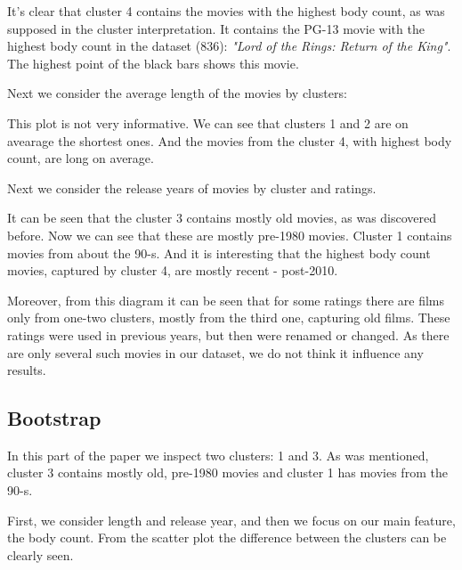 \documentclass[a4paper,14pt]{article}
\begin{document}
It's clear that cluster 4 contains the movies with the highest body count, as was supposed in the cluster interpretation. It contains the PG-13 movie with the highest body count in the dataset (836): \textit{"Lord of the Rings: Return of the King"}. The highest point of the black bars shows this movie. 

Next we consider the average length of the movies by clusters: 
\begin{center}
\end{center}
 
This plot is not very informative. We can see that clusters 1 and 2 are on avearage the shortest ones. And the movies from the cluster 4, with highest body count, are long on average. 

Next we consider the release years of movies by cluster and ratings.

\begin{center}
\end{center}
 
It can be seen that the cluster 3 contains mostly old movies, as was discovered before. Now we can see that these are mostly pre-1980 movies. Cluster 1 contains movies from about the 90-s.
And it is interesting that the highest body count movies, captured by cluster 4, are mostly recent - post-2010.

Moreover, from this diagram it can be seen that for some ratings there are films only from one-two clusters, mostly from the third one, capturing old films. These ratings were used in previous years, but then were renamed or changed. As there are only several such movies in our dataset, we do not think it influence any results.


\subsection{Bootstrap}

In this part of the paper we inspect two clusters: 1 and 3. As was mentioned, cluster 3 contains mostly old, pre-1980 movies and cluster 1 has movies from the 90-s.

First, we consider length and release year, and then we focus on our main feature, the body count. From the scatter plot the difference between the clusters can be clearly seen.
            
\begin{center}
\end{center}
 
\end{document}
